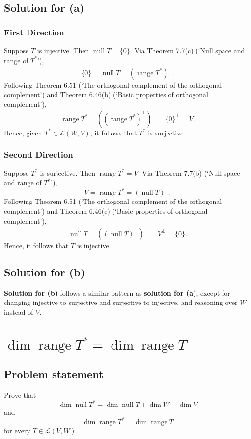 \documentclass{article}
\begin{document}
\subsection*{Solution for (a)}
\subsubsection*{First Direction}
Suppose $T$ is injective. Then $\operatorname{null}T=\{0\}$. Via Theorem 7.7(c) (`Null space and range of $T^*$'), 
\[\{0\}=\operatorname{null}T=(\operatorname{range}T^*)^\bot.\]
Following Theorem 6.51 (`The orthogonal complement of the orthogonal complement') and Theorem 6.46(b) (`Basic properties of orthogonal complement'), 
\[\operatorname{range}T^*=((\operatorname{range}T^*)^\bot)^\bot=\{0\}^\bot=V.\]
Hence, given $T^*\in\mathcal{L}(W,V)$, it follows that $T^*$ is surjective.

\subsubsection*{Second Direction}
Suppose $T^*$ is surjective. Then $\operatorname{range}T^*=V$. Via Theorem 7.7(b) (`Null space and range of $T^*$'), 
\[V=\operatorname{range}T^*=(\operatorname{null}T)^\bot.\]
Following Theorem 6.51 (`The orthogonal complement of the orthogonal complement') and Theorem 6.46(c) (`Basic properties of orthogonal complement'), 
\[\operatorname{null}T=((\operatorname{null}T)^\bot)^\bot=V^\bot=\{0\}.\]
Hence, it follows that $T$ is injective.

\subsection*{Solution for (b)}
\textbf{Solution for (b)} follows a similar pattern as \textbf{solution for (a)}, except for changing injective to surjective and surjective to injective, and reasoning over $W$ instead of $V$.

\clearpage

\section{$\operatorname{dim}\operatorname{range}T^*=\operatorname{dim}\operatorname{range}T$}
\subsection*{Problem statement}
Prove that
\[\operatorname{dim}\operatorname{null}T^*=\operatorname{dim}\operatorname{null}T+\operatorname{dim}W-\operatorname{dim}V\]
and
\[\operatorname{dim}\operatorname{range}T^*=\operatorname{dim}\operatorname{range}T\]
for every $T\in\mathcal{L}(V,W)$.
\end{document}
